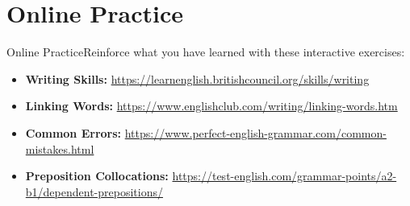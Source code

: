 \section{Online Practice}
\begin{tcolorbox}[colback=blue!5,colframe=blue!40!black,title=Resources to Practice]
Online PracticeReinforce what you have learned with these interactive exercises:
\begin{itemize}
    \item \textbf{Writing Skills:} \url{https://learnenglish.britishcouncil.org/skills/writing}
    \item \textbf{Linking Words:} \url{https://www.englishclub.com/writing/linking-words.htm}
    \item \textbf{Common Errors:} \url{https://www.perfect-english-grammar.com/common-mistakes.html}
    \item \textbf{Preposition Collocations:} \url{https://test-english.com/grammar-points/a2-b1/dependent-prepositions/}
\end{itemize}
\end{tcolorbox}